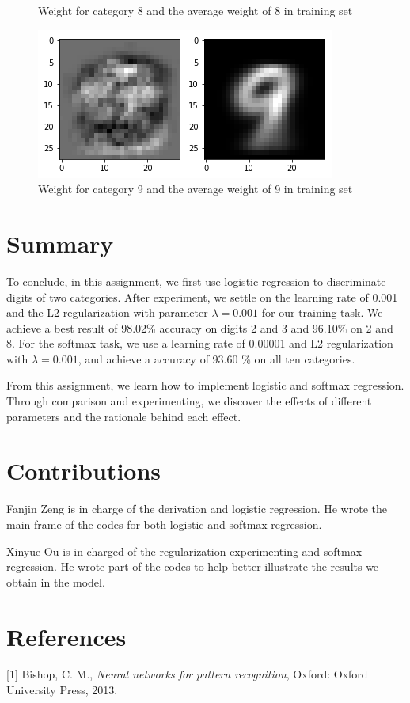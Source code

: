 \documentclass{article}
\begin{document}
\begin{figure}[thbp]
\begin{minipage}{0.48\textwidth}
		\caption{Weight for category 8 and the average weight of 8 in training set}
	\end{minipage}\hfill
	\begin {minipage}{0.48\textwidth}
	\centering
	\includegraphics[width=\textwidth]{pics/9.png}
	\caption{Weight for category 9 and the average weight of 9 in training set}
\end{minipage}
\end{figure}


\section{Summary}
To conclude, in this assignment, we first use logistic regression to discriminate digits of two categories. After experiment, we settle on the learning rate of 0.001 and the L2 regularization with parameter $\lambda = 0.001$ for our training task. We achieve a best result of 98.02\% accuracy on digits 2 and 3 and 96.10\% on 2 and 8. For the softmax task, we use a learning rate of 0.00001 and L2 regularization with  $\lambda = 0.001$, and achieve a accuracy of 93.60 \% on all ten categories.

From this assignment, we learn how to implement logistic and softmax regression. Through comparison and experimenting, we discover the effects of different parameters and the rationale behind each effect. 
\section{Contributions}
Fanjin Zeng is in charge of the derivation and logistic regression. He wrote the main frame of the codes for both logistic and softmax regression. 

Xinyue Ou is in charged of the regularization experimenting and softmax regression. He wrote part of the codes to help better illustrate the results we obtain in the model.
\section{References}
[1] Bishop, C. M., {\it Neural networks for pattern recognition}, Oxford: Oxford University Press, 2013.
\end{document}
